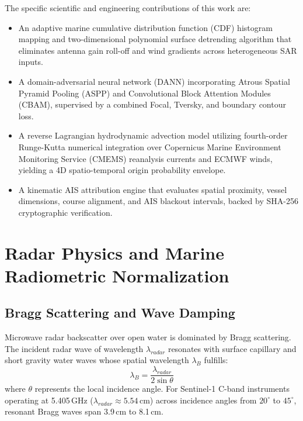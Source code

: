 \documentclass[conference]{IEEEtran}
\begin{document}
The specific scientific and engineering contributions of this work are:
\begin{itemize}
    \item An adaptive marine cumulative distribution function (CDF) histogram mapping and two-dimensional polynomial surface detrending algorithm that eliminates antenna gain roll-off and wind gradients across heterogeneous SAR inputs.
    \item A domain-adversarial neural network (DANN) incorporating Atrous Spatial Pyramid Pooling (ASPP) and Convolutional Block Attention Modules (CBAM), supervised by a combined Focal, Tversky, and boundary contour loss.
    \item A reverse Lagrangian hydrodynamic advection model utilizing fourth-order Runge-Kutta numerical integration over Copernicus Marine Environment Monitoring Service (CMEMS) reanalysis currents and ECMWF winds, yielding a 4D spatio-temporal origin probability envelope.
    \item A kinematic AIS attribution engine that evaluates spatial proximity, vessel dimensions, course alignment, and AIS blackout intervals, backed by SHA-256 cryptographic verification.
\end{itemize}

\section{Radar Physics and Marine Radiometric Normalization}

\subsection{Bragg Scattering and Wave Damping}
Microwave radar backscatter over open water is dominated by Bragg scattering. The incident radar wave of wavelength $\lambda_{radar}$ resonates with surface capillary and short gravity water waves whose spatial wavelength $\lambda_B$ fulfills:
\begin{equation}
\lambda_B = \frac{\lambda_{radar}}{2 \sin \theta}
\label{eq:bragg}
\end{equation}
where $\theta$ represents the local incidence angle. For Sentinel-1 C-band instruments operating at 5.405\,GHz ($\lambda_{radar} \approx 5.54$\,cm) across incidence angles from $20^\circ$ to $45^\circ$, resonant Bragg waves span 3.9\,cm to 8.1\,cm. 
\end{document}
